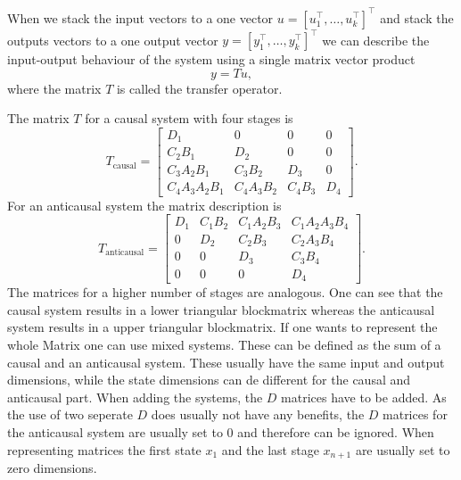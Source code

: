 \documentclass[doctype=mastersthesis,BCOR=15mm,biblatex]{ldvbook}%
\begin{document}
When we stack the input vectors to a one vector $u = [u_1^\top, \dots ,u_k^\top]^\top$ and stack the outputs vectors to a one output vector $y = [y_1^\top, \dots ,y_k^\top]^\top$ we can describe the input-output behaviour of the system using a single matrix vector product 
\begin{equation}\label{eq:System_mat_vec}
	y = Tu,
\end{equation}
where the matrix $T$ is called the transfer operator.

The matrix $T$ for a causal system with four stages is
\begin{equation}\label{eq:T_causal}
T_\text{causal}=
\begin{bmatrix}D_{1} & 0 & 0 & 0\\C_{2} B_{1} & D_{2} & 0 & 0\\
C_{3} A_{2} B_{1} & C_{3} B_{2} & D_{3} & 0\\
C_{4} A_{3} A_{2} B_{1} & C_{4} A_{3} B_{2} & C_{4} B_{3} & D_{4}\end{bmatrix}
.
\end{equation}
For an anticausal system the matrix description is 
\begin{equation}
T_{\text{anticausal}}=
\begin{bmatrix}D_{1} & C_{1} B_{2} & C_{1} A_{2} B_{3} & C_{1} A_{2} A_{3} B_{4}\\
0 & D_{2} & C_{2} B_{3} & C_{2} A_{3} B_{4}\\
0 & 0 & D_{3} & C_{3} B_{4}\\
0 & 0 & 0 & D_{4}\end{bmatrix}.
\end{equation}
The matrices for a higher number of stages are analogous.
One can see that the causal system results in a lower triangular blockmatrix whereas the anticausal system results in a upper triangular blockmatrix.
If one wants to represent the whole Matrix one can use mixed systems.
These can be defined as the sum of a causal and an anticausal system.
These usually have the same input and output dimensions, while the state dimensions can de different for the causal and anticausal part.
When adding the systems,  the $D$ matrices have to be added.
As the use of two seperate $D$ does usually not have any benefits, the $D$ matrices for the anticausal system are usually set to 0 and therefore can be ignored.
When representing matrices the first state $x_1$ and the last stage $x_{n+1}$ are usually set to zero dimensions.
\end{document}
